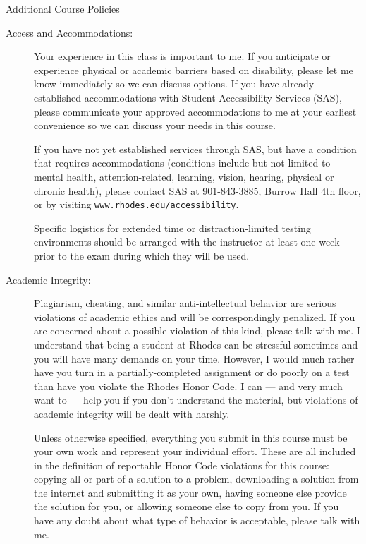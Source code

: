 \documentclass [letterpaper,11pt]{article}
\begin{document}
\begin{center}
\Large Additional Course Policies
\end{center}

\begin{description}

\item[Access and Accommodations:]
Your experience in this class is important to me.  If you anticipate or experience physical or academic barriers based on disability, please let me know immediately so we can discuss options.  If you have already established accommodations with Student Accessibility Services (SAS), please communicate your approved accommodations to me at your earliest convenience so we can discuss your needs in this course.

If you have not yet established services through SAS, but have a condition that requires accommodations (conditions include but not limited to mental health, attention-related, learning, vision, hearing, physical or chronic health), please contact SAS at 901-843-3885, Burrow Hall 4th floor, or by visiting  \texttt{www.rhodes.edu/accessibility}.

Specific logistics for extended time or distraction-limited testing environments should be arranged with the instructor 
at least one week prior to the exam during which they 
will be used.

  \item[Academic Integrity:]
   Plagiarism, cheating, and similar anti-intellectual behavior are serious violations of academic ethics and will be correspondingly penalized. If you are concerned about a possible violation of this kind, please talk with me.  I understand that being a student at Rhodes 
can be stressful sometimes and you will have many demands on your time.  However, I would
much rather have you turn in a partially-completed assignment or do poorly on a test than
have you violate the Rhodes Honor Code.  I can --- and very much want to --- help you if you don't understand the material, but violations of academic integrity will be dealt with harshly.
   
Unless otherwise specified, everything you submit in this course must be your own work and represent
your individual effort.  These are all included in the definition of reportable Honor Code violations for this course:
copying all or part of a solution to a problem, downloading a solution from the internet and submitting it as your own, having someone else provide the solution for you, or allowing someone else to copy from you.    If you have any doubt about what type of behavior is acceptable, please talk with me.


\end{description}
\end{document}
